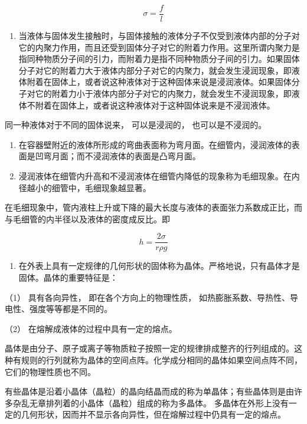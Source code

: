 \[
\sigma = \frac {f}{l}
\]

\begin{enumerate}
\def\labelenumi{\arabic{enumi}.}
\setcounter{enumi}{2}
\tightlist
\item
  当液体与固体发生接触时，与固体接触的液体分子不仅受到液体内部的分子对它的内聚力作用，而且还受到固体分子对它的附着力作用。这里所谓内聚力是指同种物质分子间的引力，而附着力是指不同种物质分子间的引力。如果固体分子对它的附着力大于液体内部分子对它的内聚力，就会发生浸润现象，即液体附着在固体上，或者说这种液体对于这种固体来说是浸润液体。如果固体分子对它的附着力小于液体内部分子对它的内聚力，就会发生不浸润现象，即液体不附着在固体上，或者说这种液体对于这种固体说来是不浸润液体。
\end{enumerate}

同一种液体对于不同的固体说来， 可以是浸润的， 也可以是不浸润的。

\begin{enumerate}
\def\labelenumi{\arabic{enumi}.}
\setcounter{enumi}{3}
\item
  在容器壁附近的液体所形成的弯曲表面称为弯月面。在细管内，浸润液体的表面是凹弯月面；而不浸润液体的表面是凸弯月面。
\item
  浸润液体在细管内升高和不浸润液体在细管内降低的现象称为毛细现象。在内径越小的细管中，毛细现象越显著。
\end{enumerate}

在毛细现象中，管内液柱上升或下降的最大长度与液体的表面张力系数成正比，而与毛细管的内半径以及液体的密度成反比。即

\[
h = \frac {2 \sigma}{r \rho g}
\]

\begin{enumerate}
\def\labelenumi{\arabic{enumi}.}
\setcounter{enumi}{5}
\tightlist
\item
  在外表上具有一定规律的几何形状的固体称为晶体。严格地说，只有晶体才是固体。晶体的重要特征是：
\end{enumerate}

（1） 具有各向异性， 即在各个方向上的物理性质，
如热膨胀系数、导热性、导电性、强度等等都是不同的。

（2） 在熔解成液体的过程中具有一定的熔点。

晶体是由分子、原子或离子等物质粒子按照一定的规律排成整齐的行列组成的。这种有规则的行列就称为晶体的空间点阵。化学成分相同的晶体如果空间点阵不同，它们的物理性质也不同。

有些晶体是沿着小晶体（晶粒）的晶向结晶而成的称为单晶体；有些晶体则是由许多杂乱无章排列着的小晶体（晶粒）组成的称为多晶体。
多晶体在外形上没有一定的几何形状，因而并不显示各向异性，但在熔解过程中仍具有一定的熔点。

